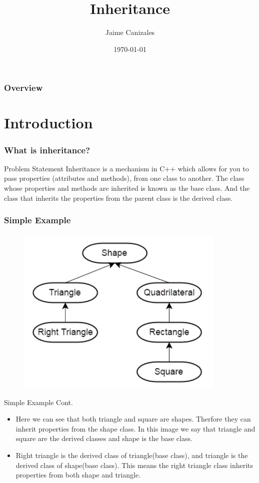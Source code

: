 \documentclass{beamer}
\title[Inheritance]{Inheritance}
\author{Jaime Canizales}
\institute[Hunter College] 
{
City University of New York \\ 
\medskip
\textit{jaime.canizales@hunter.cuny.edu} 
}
\date{\today}
\begin{document}
\begin{frame}
\titlepage 
\end{frame}


\begin{frame} \frametitle{Overview} 
\tableofcontents
\end{frame}


\section{Introduction}
\begin{frame}\frametitle{What is inheritance?}
\begin{block}{Problem Statement}
    Inheritance is a mechanism in C++ which allows for you to pass 
    properties (attributes and methods), from one class to another. 
    The class whose properties and methods are inherited is known as the base class.
     And the class that inherits the properties from the parent class is the derived class.
\end{block}
\end{frame}


\begin{frame}\frametitle{Simple Example}
    \begin{figure}
        \includegraphics[width=10cm]{shapes.png}
    \end{figure}
    \end{frame}


\begin{frame}{Simple Example Cont.}
\begin{itemize}
\item Here we can see that both triangle and square are shapes. Therfore they can inherit properties
from the shape class. In this image we say that triangle and square are the derived classes and shape is the base class.
\item Right triangle is the derived class of triangle(base class), and triangle is the derived class
of shape(base class). This means the right triangle class inherits properties from both shape and triangle.
\end{itemize}
\end{frame}
\end{document}
